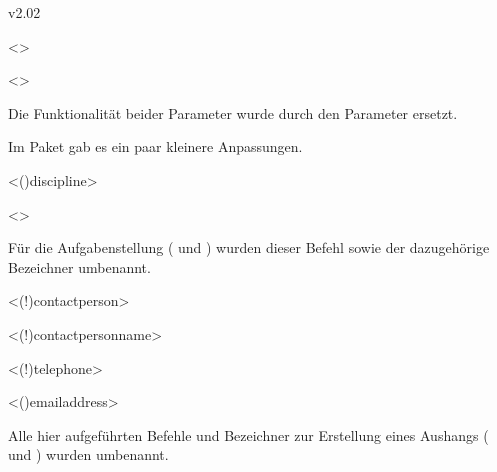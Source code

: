 \begin{NoIndexDefault}
\begin{Cessations}{v2.02}
\begin{Declaration*}
  {}
\begin{Cessation}
  {}
  <>
\begin{Cessation}
  {}
  <>
\printdeclarationlist

Die Funktionalität beider Parameter wurde durch den Parameter 
 ersetzt.
\end{Cessation}
\end{Cessation}
\end{Declaration*}



\begin{Entity}{}
Im Paket  gab es ein paar kleinere Anpassungen.
\begin{Cessation}
  {}
  <\Macro(){discipline}>
\begin{Cessation}
  {}
  <>
\printdeclarationlist

Für die Aufgabenstellung ( und ) wurden 
dieser Befehl sowie der dazugehörige Bezeichner umbenannt.
\end{Cessation}
\end{Cessation}

\begin{Cessation}
  {}
  <\Macro(!){contactperson}>
\begin{Cessation}
  {}
  <\Term(!){contactpersonname}>
\begin{Cessation}
  {}
  <\Macro(!){telephone}>
\begin{Cessation}
  {}
  <\Macro(){emailaddress}>
\printdeclarationlist

Alle hier aufgeführten Befehle und Bezeichner zur Erstellung eines Aushangs 
( und ) wurden umbenannt.
\end{Cessation}
\end{Cessation}
\end{Cessation}
\end{Cessation}
\end{Entity}
\end{Cessations}




\end{NoIndexDefault}
